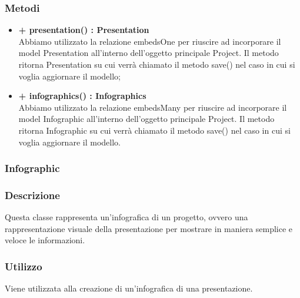 	\subsubsection*{Metodi}
	\begin{itemize}
		\item \textbf{+ presentation() : Presentation}\\
		Abbiamo utilizzato la relazione embedsOne per riuscire ad incorporare il model Presentation all’interno dell’oggetto principale Project. Il metodo ritorna Presentation su cui verrà chiamato il metodo save() nel caso in cui si voglia aggiornare il modello;
		\item \textbf{+ infographics() : Infographics}\\
		Abbiamo utilizzato la relazione embedsMany per riuscire ad incorporare il model Infographic all’interno dell’oggetto principale Project. Il metodo ritorna Infographic su cui verrà chiamato il metodo save() nel caso in cui si voglia aggiornare il modello.
	\end{itemize}

\newpage
\subsubsection{Infographic}


	\subsubsection*{Descrizione}
	Questa classe rappresenta un’infografica di un progetto, ovvero una rappresentazione visuale della presentazione per mostrare in maniera semplice e veloce le informazioni.
	
	\subsubsection*{Utilizzo}
Viene utilizzata alla creazione di un’infografica di una presentazione.

